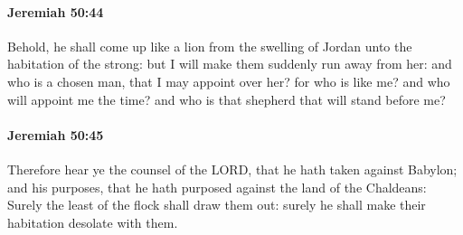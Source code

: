 		\paragraph{Jeremiah 50:44} %
			\label{JEREMIAH-50-44}

			Behold, he shall come up like a lion from the swelling of Jordan unto the habitation of the strong: but I will make them suddenly run away from her: and who is a chosen man, that I may appoint over her? for who is like me? and who will appoint me the time? and who is that shepherd that will stand before me?


		\paragraph{Jeremiah 50:45} %
			\label{JEREMIAH-50-45}

			Therefore hear ye the counsel of the LORD, that he hath taken against Babylon; and his purposes, that he hath purposed against the land of the Chaldeans: Surely the least of the flock shall draw them out: surely he shall make their habitation desolate with them.

